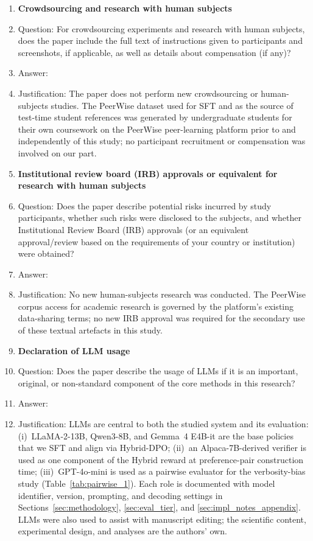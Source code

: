 \begin{enumerate}
\item {\bf Crowdsourcing and research with human subjects}
    \item[] Question: For crowdsourcing experiments and research with human subjects, does the paper include the full text of instructions given to participants and screenshots, if applicable, as well as details about compensation (if any)?
    \item[] Answer: \answerNA{}
    \item[] Justification: The paper does not perform new crowdsourcing or human-subjects studies. The PeerWise dataset used for SFT and as the source of test-time student references was generated by undergraduate students for their own coursework on the PeerWise peer-learning platform prior to and independently of this study; no participant recruitment or compensation was involved on our part.

\item {\bf Institutional review board (IRB) approvals or equivalent for research with human subjects}
    \item[] Question: Does the paper describe potential risks incurred by study participants, whether such risks were disclosed to the subjects, and whether Institutional Review Board (IRB) approvals (or an equivalent approval/review based on the requirements of your country or institution) were obtained?
    \item[] Answer: \answerNA{}
    \item[] Justification: No new human-subjects research was conducted. The PeerWise corpus access for academic research is governed by the platform's existing data-sharing terms; no new IRB approval was required for the secondary use of these textual artefacts in this study.

\item {\bf Declaration of LLM usage}
    \item[] Question: Does the paper describe the usage of LLMs if it is an important, original, or non-standard component of the core methods in this research?
    \item[] Answer: \answerYes{}
    \item[] Justification: LLMs are central to both the studied system and its evaluation: (i)~LLaMA-2-13B, Qwen3-8B, and Gemma~4 E4B-it are the base policies that we SFT and align via Hybrid-DPO; (ii)~an Alpaca-7B-derived verifier is used as one component of the Hybrid reward at preference-pair construction time; (iii)~GPT-4o-mini is used as a pairwise evaluator for the verbosity-bias study (Table~\ref{tab:pairwise_1}). Each role is documented with model identifier, version, prompting, and decoding settings in Sections~\ref{sec:methodology}, \ref{sec:eval_tier}, and \ref{sec:impl_notes_appendix}. LLMs were also used to assist with manuscript editing; the scientific content, experimental design, and analyses are the authors' own.

\end{enumerate}
